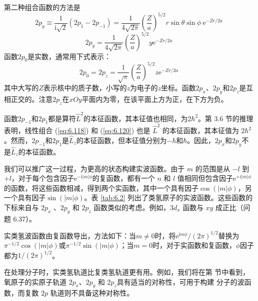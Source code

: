     第二种组合函数的方法是
    \begin{equation}
        2p_y \equiv \frac{1}{\mathrm{i}\sqrt{2}}\left(2p_1 - 2p_{-1}\right) = \frac{1}{4\sqrt{2\pi}}\left(\frac{Z}{a}\right)^{5/2}r\sin\theta\sin\phi\:\mathrm{e}^{-Zr/2a}
        \label{eq:6.120}
    \end{equation}
    \begin{equation}
        2p_y = \frac{1}{4\sqrt{2\pi}}\left(\frac{Z}{a}\right)^{5/2}y\mathrm{e}^{-Zr/2a}
        \label{eq:6.121}
    \end{equation}
    函数$2p_0$是实数，通常用下式表示：
    \begin{equation}
        2p_0 = 2p_z = \frac{1}{\sqrt{\pi}}\left(\frac{Z}{a}\right)^{5/2}z\mathrm{e}^{-Zr/2a}
        \label{eq:6.122}
    \end{equation}
    其中大写的$Z$表示核中的质子数，小写的$z$为电子的$z$坐标。函数$2p_x$、$2p_y$和$2p_z$是互相正交的。注意$2p_z$在$xOy$平面内为零，在该平面上方为正，在下方为负。

    函数$2p_{-1}$和$2p_1$都是算符$\hat{L}^2$的本征函数，其本征值也相同，为$2\hbar^2$。第 3.6 节的推理表明，线性组合 (\ref{eq:6.118}) 和 (\ref{eq:6.120}) 也是 $\hat{L}^2$ 的本征函数，其本征值为 $2\hbar^2$ 。然而，$2p_{-1}$和$2p_1$是$\hat{L}_z$的本征函数，但本征值分别为$-\hbar$和$\hbar$。因此，$2p_x$和$2p_y$不是$\hat{L}_z$的本征函数。

    我们可以推广这一过程，为更高的状态构建实波函数。由于 $m$ 的范围是从 $- l$ 到 $+ l$，对于每个包含因子$\mathrm{e}^{-\mathrm{i}\left|m\right|\phi}$的复函数，都有一个 $n$ 和 $l$ 值相同但包含因子$\mathrm{e}^{+\mathrm{i}\left|m\right|\phi}$的函数，将这些函数相减，得到两个实函数，其中一个具有因子$\cos\left(\left|m\right|\phi\right)$，另一个具有因子$\sin\left(\left|m\right|\phi\right)$。表 \ref{tab:6.2} 列出了类氢原子的实波函数。这些函数的下标来自与 $2p_x$ 、$2p_y$ 和 $2p_z$ 函数类似的考虑。例如，$3d_{x}$ 函数与 $xy$ 成正比（问题 6.37）。

    实类氢波函数由复函数导出，方法如下：当$m \neq 0$时，将$\mathrm{e}^{\mathrm{i}m\phi}/\left(2\pi\right)^{1/2}$替换为$\pi^{-1/2}\cos\left(\left|m\right|\phi\right)$或$\pi^{-1/2}\sin\left(\left|m\right|\phi\right)$；当$m=0$时，对于实函数和复函数，$\phi$因子都为$1/\left(2\pi\right)^{1/2}$。

    在处理分子时，实类氢轨道比复类氢轨道更有用。例如，我们将在第 节中看到，氧原子的实原子轨道 $2p_x$、$2p_y$ 和 $2p_z$具有适当的对称性，可用于构建  分子的波函数，而复数 $2p$ 轨道则不具备这种对称性。


